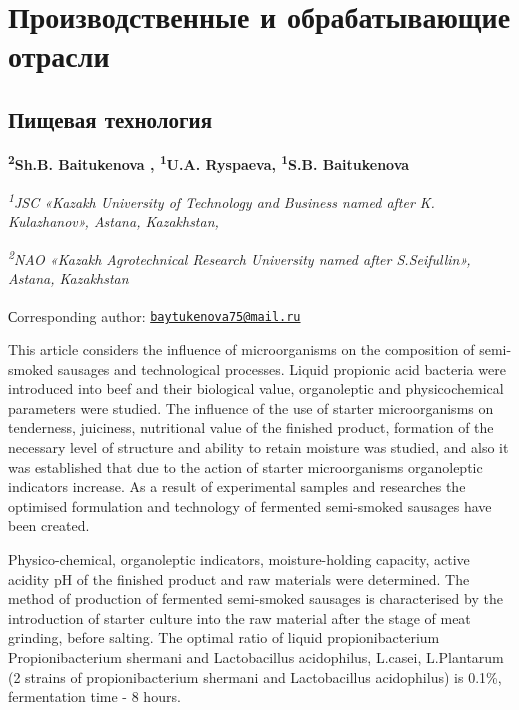 \newpage
\let\cleardoublepage\clearpage
\part{Производственные и обрабатывающие отрасли}
\chapter{Пищевая технология}

\begin{articleheader}

{\bfseries
\textsuperscript{2}Sh.B. Baitukenova\textsuperscript{\envelope } \authorid,
\textsuperscript{1}U.A. Ryspaeva\authorid,
\textsuperscript{1}S.B. Baitukenova\authorid}
\end{articleheader}

\begin{affiliation}
\emph{\textsuperscript{1}JSC «Kazakh University of Technology and
Business named after K. Kulazhanov», Astana, Kazakhstan,}

\emph{\textsuperscript{2}NAO «Kazakh Agrotechnical Research University
named after S.Seifullin», Astana, Kazakhstan}

\raggedright {\bfseries \textsuperscript{\envelope }}Сorresponding author: \href{mailto:baytukenova75@mail.ru}{\nolinkurl{baytukenova75@mail.ru}}
\end{affiliation}

This article considers the influence of microorganisms on the
composition of semi-smoked sausages and technological processes. Liquid
propionic acid bacteria were introduced into beef and their biological
value, organoleptic and physicochemical parameters were studied. The
influence of the use of starter microorganisms on tenderness, juiciness,
nutritional value of the finished product, formation of the necessary
level of structure and ability to retain moisture was studied, and also
it was established that due to the action of starter microorganisms
organoleptic indicators increase. As a result of experimental samples
and researches the optimised formulation and technology of fermented
semi-smoked sausages have been created.

Physico-chemical, organoleptic indicators, moisture-holding capacity,
active acidity pH of the finished product and raw materials were
determined. The method of production of fermented semi-smoked sausages
is characterised by the introduction of starter culture into the raw
material after the stage of meat grinding, before salting. The optimal
ratio of liquid propionibacterium Propionibacterium shermani and
Lactobacillus acidophilus, L.casei, L.Plantarum (2 strains of
propionibacterium shermani and Lactobacillus acidophilus) is 0.1\%,
fermentation time - 8 hours.

